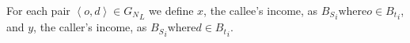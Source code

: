 For each pair \( \left< o, d \right> \in {G_N}_L \) we define \( x \), the callee's income, as \( {B_S}_i \text{where} o \in {B_t}_i \), and \( y \), the caller's income, as \( {B_S}_i \text{where} d \in {B_t}_i \).